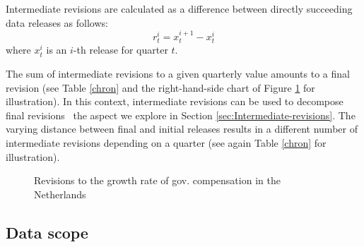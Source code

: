 Intermediate revisions are calculated as a difference between directly
succeeding data releases as follows:
\[
r_{t}^{i}=x_{t}^{i+1}-x_{t}^{i}
\]
where $x_{t}^{i}$ is an $i$-th release for quarter $t$. 

The sum of intermediate revisions to a given quarterly value amounts
to a final revision (see Table \ref{chron} and the right-hand-side
chart of Figure \ref{fig:dataoverview1} for illustration). In this
context, intermediate revisions can be used to decompose final revisions
\textemdash~the aspect we explore in Section \ref{sec:Intermediate-revisions}.
The varying distance between final and initial releases results in
a different number of intermediate revisions depending on a quarter
(see again Table \ref{chron} for illustration).

\begin{figure}[H]
\begin{centering}
\caption{Revisions to the growth rate of gov. compensation in the Netherlands\label{fig:dataoverview1}}
\par\end{centering}
\begin{centering}
\centering

\par\end{centering}
\end{figure}


\subsection{Data scope}

